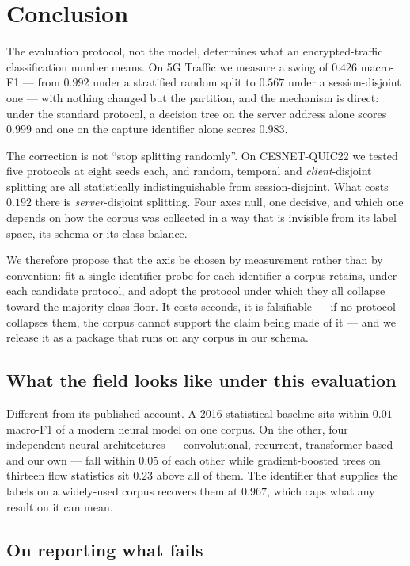 \section{Conclusion}
\label{sec:conclusion}

The evaluation protocol, not the model, determines what an encrypted-traffic
classification number means. On 5G Traffic we measure a swing of $0.426$
macro-F1 --- from $0.992$ under a stratified random split to $0.567$ under a
session-disjoint one --- with nothing changed but the partition, and the
mechanism is direct: under the standard protocol, a decision tree on the server
address alone scores $0.999$ and one on the capture identifier alone scores
$0.983$.

The correction is not ``stop splitting randomly''. On CESNET-QUIC22 we tested
five protocols at eight seeds each, and random, temporal and
\emph{client}-disjoint splitting are all statistically indistinguishable from
session-disjoint. What costs $0.192$ there is \emph{server}-disjoint splitting.
Four axes null, one decisive, and which one depends on how the corpus was
collected in a way that is invisible from its label space, its schema or its
class balance.

We therefore propose that the axis be chosen by measurement rather than by
convention: fit a single-identifier probe for each identifier a corpus retains,
under each candidate protocol, and adopt the protocol under which they all
collapse toward the majority-class floor. It costs seconds, it is falsifiable
--- if no protocol collapses them, the corpus cannot support the claim being
made of it --- and we release it as a package that runs on any corpus in our
schema.

\subsection*{What the field looks like under this evaluation}

Different from its published account. A 2016 statistical baseline sits within
$0.01$ macro-F1 of a modern neural model on one corpus. On the other, four
independent neural architectures --- convolutional, recurrent,
transformer-based and our own --- fall within $0.05$ of each other while
gradient-boosted trees on thirteen flow statistics sit $0.23$ above all of
them. The identifier that supplies the labels on a widely-used corpus recovers
them at $0.967$, which caps what any result on it can mean.

\subsection*{On reporting what fails}


